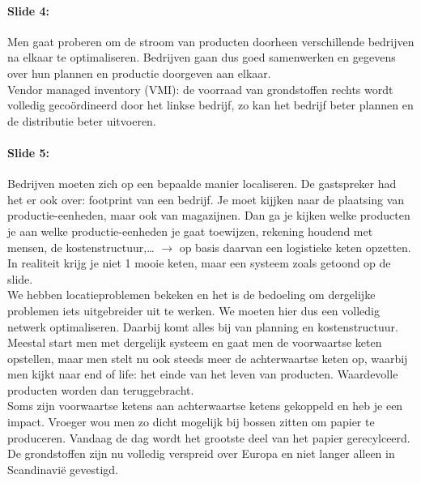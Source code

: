 \documentclass[10pt,a4paper]{report}
\begin{document}
\paragraph{Slide 4:} Men gaat proberen om de stroom van producten doorheen verschillende bedrijven na elkaar te optimaliseren. Bedrijven gaan dus goed samenwerken en gegevens over hun plannen en productie doorgeven aan elkaar. \\
Vendor managed inventory (VMI): de voorraad van grondstoffen rechts wordt volledig geco\"ordineerd door het linkse bedrijf, zo kan het bedrijf beter plannen en de distributie beter uitvoeren.

\paragraph{Slide 5:} Bedrijven moeten zich op een bepaalde manier localiseren. De gastspreker had het er ook over: footprint van een bedrijf. Je moet kijjken naar de plaatsing van productie-eenheden, maar ook van magazijnen. Dan ga je kijken welke producten je aan welke productie-eenheden je gaat toewijzen, rekening houdend met mensen, de kostenstructuur,… $\rightarrow$ op basis daarvan een logistieke keten opzetten. \\
In realiteit krijg je niet 1 mooie keten, maar een systeem zoals getoond op de slide. \\
We hebben locatieproblemen bekeken en het is de bedoeling om dergelijke problemen iets uitgebreider uit te werken. We moeten hier dus een volledig netwerk optimaliseren. Daarbij komt alles bij van planning en kostenstructuur.\\
Meestal start men met dergelijk systeem en gaat men de voorwaartse keten opstellen, maar men stelt nu ook steeds meer de achterwaartse keten op, waarbij men kijkt naar end of life: het einde van het leven van producten. Waardevolle producten worden dan teruggebracht. \\
Soms zijn voorwaartse ketens aan achterwaartse ketens gekoppeld en heb je een impact. Vroeger wou men zo dicht mogelijk bij bossen zitten om papier te produceren. Vandaag de dag wordt het grootste deel van het papier gerecylceerd. De grondstoffen zijn nu volledig verspreid over Europa en niet langer alleen in Scandinavi\"e gevestigd.
\end{document}
